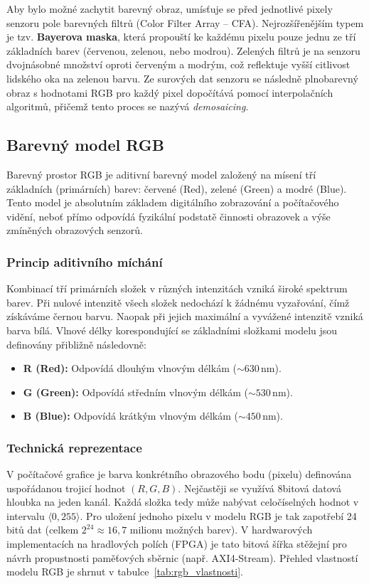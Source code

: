 \documentclass[FM,DP]{tulthesis}
\begin{document}
Aby bylo možné zachytit barevný obraz, umísťuje se před jednotlivé pixely
senzoru pole barevných filtrů (Color Filter Array -- CFA). Nejrozšířenějším
typem je tzv. \textbf{Bayerova maska}, která propouští ke každému pixelu pouze
jednu ze tří základních barev (červenou, zelenou, nebo modrou). Zelených filtrů
je na senzoru dvojnásobné množství oproti červeným a modrým, což reflektuje
vyšší citlivost lidského oka na zelenou barvu. Ze surových dat senzoru se
následně plnobarevný obraz s hodnotami RGB pro každý pixel dopočítává pomocí
interpolačních algoritmů, přičemž tento proces se nazývá \textit{demosaicing}.

\subsection{Barevný model RGB}
Barevný prostor RGB je aditivní barevný model založený na mísení tří základních
(primárních) barev: červené (Red), zelené (Green) a modré (Blue). Tento model
je absolutním základem digitálního zobrazování a počítačového vidění, neboť
přímo odpovídá fyzikální podstatě činnosti obrazovek a výše zmíněných
obrazových senzorů.

\subsubsection*{Princip aditivního míchání}
Kombinací tří primárních složek v různých intenzitách vzniká široké spektrum barev. Při nulové intenzitě všech složek nedochází k žádnému vyzařování, čímž získáváme černou barvu. Naopak při jejich maximální a vyvážené intenzitě vzniká barva bílá. Vlnové délky korespondující se základními složkami modelu jsou definovány přibližně následovně:
\begin{itemize}
    \item \textbf{R (Red):} Odpovídá dlouhým vlnovým délkám ($\sim 630$\,nm).
    \item \textbf{G (Green):} Odpovídá středním vlnovým délkám ($\sim 530$\,nm).
    \item \textbf{B (Blue):} Odpovídá krátkým vlnovým délkám ($\sim 450$\,nm).
\end{itemize}

\subsubsection*{Technická reprezentace}
V počítačové grafice je barva konkrétního obrazového bodu (pixelu) definována uspořádanou trojicí hodnot $(R, G, B)$. Nejčastěji se využívá 8bitová datová hloubka na jeden kanál. Každá složka tedy může nabývat celočíselných hodnot v intervalu $\langle 0, 255 \rangle$. Pro uložení jednoho pixelu v modelu RGB je tak zapotřebí 24 bitů dat (celkem $2^{24} \approx 16,7$ milionu možných barev). V hardwarových implementacích na hradlových polích (FPGA) je tato bitová šířka stěžejní pro návrh propustnosti paměťových sběrnic (např. AXI4-Stream). Přehled vlastností modelu RGB je shrnut v tabulce~\ref{tab:rgb_vlastnosti}.
\end{document}
